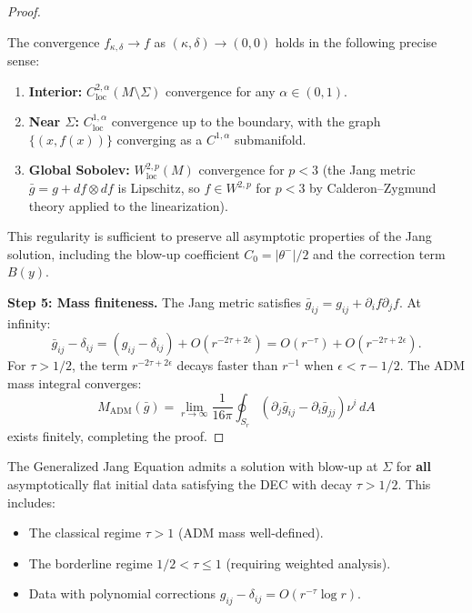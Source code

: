 \begin{proof}
\begin{remark}\label{rem:RegularizationTopology}
The convergence $f_{\kappa,\delta} \to f$ as $(\kappa, \delta) \to (0,0)$ holds in the following precise sense:
\begin{enumerate}
    \item \textbf{Interior:} $C^{2,\alpha}_{\mathrm{loc}}(M \setminus \Sigma)$ convergence for any $\alpha \in (0,1)$.
    \item \textbf{Near $\Sigma$:} $C^{1,\alpha}_{\mathrm{loc}}$ convergence up to the boundary, with the graph $\{(x, f(x))\}$ converging as a $C^{1,\alpha}$ submanifold.
    \item \textbf{Global Sobolev:} $W^{2,p}_{\mathrm{loc}}(M)$ convergence for $p < 3$ (the Jang metric $\bar{g} = g + df \otimes df$ is Lipschitz, so $f \in W^{2,p}$ for $p < 3$ by Calderon--Zygmund theory applied to the linearization).
\end{enumerate}
This regularity is sufficient to preserve all asymptotic properties of the Jang solution, including the blow-up coefficient $C_0 = |\theta^-|/2$ and the correction term $B(y)$.
\end{remark}

\textbf{Step 5: Mass finiteness.}
The Jang metric satisfies $\bar{g}_{ij} = g_{ij} + \partial_i f \partial_j f$. At infinity:
\[
\bar{g}_{ij} - \delta_{ij} = (g_{ij} - \delta_{ij}) + O(r^{-2\tau+2\epsilon}) = O(r^{-\tau}) + O(r^{-2\tau+2\epsilon}).
\]
For $\tau > 1/2$, the term $r^{-2\tau+2\epsilon}$ decays faster than $r^{-1}$ when $\epsilon < \tau - 1/2$. The ADM mass integral converges:
\[
M_{\mathrm{ADM}}(\bar{g}) = \lim_{r \to \infty} \frac{1}{16\pi} \oint_{S_r} (\partial_j \bar{g}_{ij} - \partial_i \bar{g}_{jj}) \nu^i \, dA
\]
exists finitely, completing the proof.
\end{proof}

\begin{corollary}\label{cor:UnifiedGJE}
The Generalized Jang Equation admits a solution with blow-up at $\Sigma$ for \textbf{all} asymptotically flat initial data satisfying the DEC with decay $\tau > 1/2$. This includes:
\begin{itemize}
    \item The classical regime $\tau > 1$ (ADM mass well-defined).
    \item The borderline regime $1/2 < \tau \leq 1$ (requiring weighted analysis).
    \item Data with polynomial corrections $g_{ij} - \delta_{ij} = O(r^{-\tau} \log r)$.
\end{itemize}
\end{corollary}

